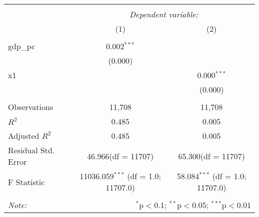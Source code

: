 \begin{table}[!htbp] \centering
\begin{tabular}{@{\extracolsep{5pt}}lcc}
\\[-1.8ex]\hline
\hline \\[-1.8ex]
& \multicolumn{2}{c}{\textit{Dependent variable:}} \
\cr \cline{2-3}
\\[-1.8ex] & (1) & (2) \\
\hline \\[-1.8ex]
 gdp_pc & 0.002$^{***}$ & \\
  & (0.000) & \\
 x1 & & 0.000$^{***}$ \\
  & & (0.000) \\
\hline \\[-1.8ex]
 Observations & 11,708 & 11,708 \\
 $R^2$ & 0.485 & 0.005 \\
 Adjusted $R^2$ & 0.485 & 0.005 \\
 Residual Std. Error & 46.966(df = 11707) & 65.300(df = 11707)  \\
 F Statistic & 11036.059$^{***}$ (df = 1.0; 11707.0) & 58.084$^{***}$ (df = 1.0; 11707.0) \\
\hline
\hline \\[-1.8ex]
\textit{Note:} & \multicolumn{2}{r}{$^{*}$p$<$0.1; $^{**}$p$<$0.05; $^{***}$p$<$0.01} \\
\end{tabular}
\end{table}
